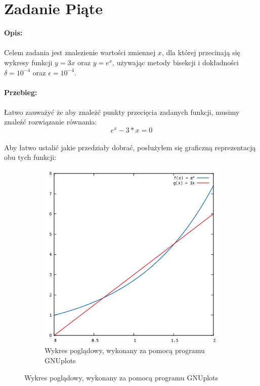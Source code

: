 \documentclass{article}
\begin{document}
\section*{Zadanie Piąte}
\noindent \textbf{Opis: }\\\\
Celem zadania jest znalezienie wartości zmiennej $x$, dla której przecinają się wykresy funkcji $y=3x$ oraz $y = e^{x}$, używając metody bisekcji i dokładności $\delta = 10^{-4}$ oraz $\epsilon = 10^{-4}$. \\\\
\noindent \textbf{Przebieg: }\\\\
Łatwo zauważyć że aby znależć punkty przecięcia zadanych funkcji, musimy znaleźć rozwiązanie równania: $$e^{x} - 3*x = 0$$\\
Aby łatwo ustalić jakie przedziały dobrać, posłużyłem się graficzną reprezentacją obu tych funkcji:
\begin{figure}[ht]
	\centering
	\begin{subfigure}{.5\textwidth}
		\centering
		\includegraphics[width=1.0\linewidth]{plots/wykres_1.png}  
		\caption*{Wykres poglądowy, wykonany za pomocą programu GNUplots}
	\end{subfigure}
\end{figure} \\
\end{document}
